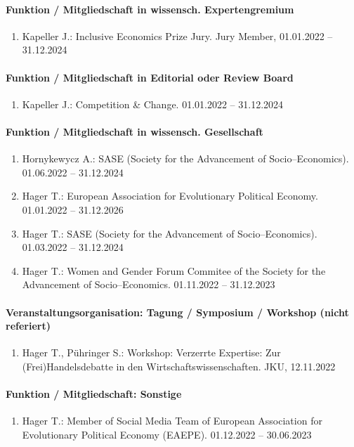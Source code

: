 \paragraph{Funktion / Mitgliedschaft in wissensch. Expertengremium}
\begin{enumerate}[leftmargin=*, labelsep=0.5cm]
\item Kapeller J.: Inclusive Economics Prize Jury. Jury Member, 01.01.2022 -- 31.12.2024
\end{enumerate}
\paragraph{Funktion / Mitgliedschaft in Editorial oder Review Board}
\begin{enumerate}[leftmargin=*, labelsep=0.5cm]
\item Kapeller J.: Competition \& Change. 01.01.2022 -- 31.12.2024
\end{enumerate}
\paragraph{Funktion / Mitgliedschaft in wissensch. Gesellschaft}
\begin{enumerate}[leftmargin=*, labelsep=0.5cm]
\item Hornykewycz A.: SASE (Society for the Advancement of Socio--Economics). 01.06.2022 -- 31.12.2024
\item Hager T.: European Association for Evolutionary Political Economy. 01.01.2022 -- 31.12.2026
\item Hager T.: SASE (Society for the Advancement of Socio--Economics). 01.03.2022 -- 31.12.2024
\item Hager T.: Women and Gender Forum Commitee of the Society for the Advancement of Socio--Economics. 01.11.2022 -- 31.12.2023
\end{enumerate}
\paragraph{Veranstaltungsorganisation: Tagung / Symposium / Workshop (nicht referiert)}
\begin{enumerate}[leftmargin=*, labelsep=0.5cm]
\item Hager T., Pühringer S.: Workshop: Verzerrte Expertise: Zur (Frei)Handelsdebatte in den Wirtschaftswissenschaften. JKU, 12.11.2022
\end{enumerate}
\paragraph{Funktion / Mitgliedschaft: Sonstige}
\begin{enumerate}[leftmargin=*, labelsep=0.5cm]
\item Hager T.: Member of Social Media Team of European Association for Evolutionary Political Economy (EAEPE). 01.12.2022 -- 30.06.2023
\end{enumerate}
